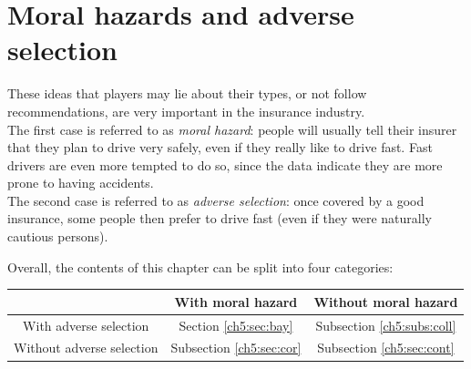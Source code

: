 \section{Moral hazards and adverse selection}

These ideas that players may lie about their types, or not follow recommendations, are very important in the insurance industry.\\
 The first case is referred to as \emph{moral hazard}: people will usually tell their insurer that they plan to drive very safely, even if they really like to drive fast. Fast drivers are even more tempted to do so, since the data indicate they are more prone to having accidents.\\
  The second case is referred to as \emph{adverse selection}: once covered by a good insurance, some people then prefer to drive fast (even if they were naturally cautious persons).
  
  Overall, the contents of this chapter can be split into four categories:
  
  \begin{tabular}{c | c | c}
  & With moral hazard & Without moral hazard \\
  \hline
  With adverse selection   & Section \ref{ch5:sec:bay} &  Subsection \ref{ch5:subs:coll} \\
  \hline
  Without adverse selection  & Subsection \ref{ch5:sec:cor}  & Subsection \ref{ch5:sec:cont} \\
  \end{tabular}  
 

 
  
 



\ifx \globalmark \undefined %


	
\else 
	
\fi
